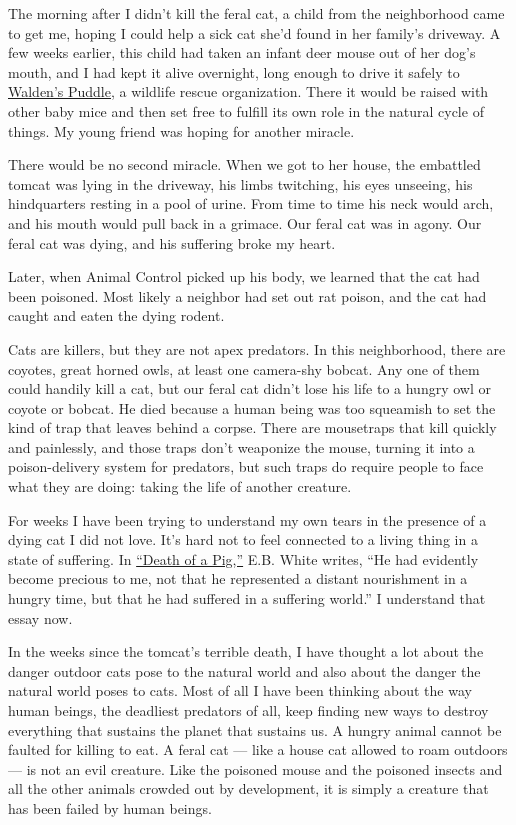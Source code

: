 The morning after I didn't kill the feral cat, a child from the
neighborhood came to get me, hoping I could help a sick cat she'd found
in her family's driveway. A few weeks earlier, this child had taken an
infant deer mouse out of her dog's mouth, and I had kept it alive
overnight, long enough to drive it safely to
\href{https://waldenspuddle.org/}{Walden's Puddle}, a wildlife rescue
organization. There it would be raised with other baby mice and then set
free to fulfill its own role in the natural cycle of things. My young
friend was hoping for another miracle.

There would be no second miracle. When we got to her house, the
embattled tomcat was lying in the driveway, his limbs twitching, his
eyes unseeing, his hindquarters resting in a pool of urine. From time to
time his neck would arch, and his mouth would pull back in a grimace.
Our feral cat was in agony. Our feral cat was dying, and his suffering
broke my heart.

Later, when Animal Control picked up his body, we learned that the cat
had been poisoned. Most likely a neighbor had set out rat poison, and
the cat had caught and eaten the dying rodent.

Cats are killers, but they are not apex predators. In this neighborhood,
there are coyotes, great horned owls, at least one camera-shy bobcat.
Any one of them could handily kill a cat, but our feral cat didn't lose
his life to a hungry owl or coyote or bobcat. He died because a human
being was too squeamish to set the kind of trap that leaves behind a
corpse. There are mousetraps that kill quickly and painlessly, and those
traps don't weaponize the mouse, turning it into a poison-delivery
system for predators, but such traps do require people to face what they
are doing: taking the life of another creature.

For weeks I have been trying to understand my own tears in the presence
of a dying cat I did not love. It's hard not to feel connected to a
living thing in a state of suffering. In
\href{https://www.theatlantic.com/magazine/archive/1948/01/death-pig/309203/}{``Death
of a Pig,''} E.B. White writes, ``He had evidently become precious to
me, not that he represented a distant nourishment in a hungry time, but
that he had suffered in a suffering world.'' I understand that essay
now.

In the weeks since the tomcat's terrible death, I have thought a lot
about the danger outdoor cats pose to the natural world and also about
the danger the natural world poses to cats. Most of all I have been
thinking about the way human beings, the deadliest predators of all,
keep finding new ways to destroy everything that sustains the planet
that sustains us. A hungry animal cannot be faulted for killing to eat.
A feral cat --- like a house cat allowed to roam outdoors --- is not an
evil creature. Like the poisoned mouse and the poisoned insects and all
the other animals crowded out by development, it is simply a creature
that has been failed by human beings.

